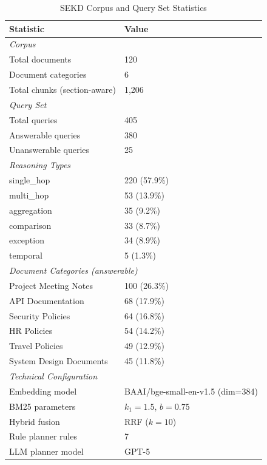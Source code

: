 
\usepackage{booktabs}
\usepackage{multirow}
\usepackage{siunitx}
\usepackage{xcolor}
\usepackage{caption}


\begin{table}[ht]
\centering
\caption{SEKD Corpus and Query Set Statistics}
\label{tab:dataset}
\begin{tabular}{ll}
\toprule
\textbf{Statistic} & \textbf{Value} \\
\midrule
\multicolumn{2}{l}{\textit{Corpus}} \\
\quad Total documents & 120 \\
\quad Document categories & 6 \\
\quad Total chunks (section-aware) & 1{,}206 \\
\midrule
\multicolumn{2}{l}{\textit{Query Set}} \\
\quad Total queries & 405 \\
\quad Answerable queries & 380 \\
\quad Unanswerable queries & 25 \\
\midrule
\multicolumn{2}{l}{\textit{Reasoning Types}} \\
\quad single\_hop & 220 (57.9\%) \\
\quad multi\_hop & 53 (13.9\%) \\
\quad aggregation & 35 (9.2\%) \\
\quad comparison & 33 (8.7\%) \\
\quad exception & 34 (8.9\%) \\
\quad temporal & 5 (1.3\%) \\
\midrule
\multicolumn{2}{l}{\textit{Document Categories (answerable)}} \\
\quad Project Meeting Notes & 100 (26.3\%) \\
\quad API Documentation & 68 (17.9\%) \\
\quad Security Policies & 64 (16.8\%) \\
\quad HR Policies & 54 (14.2\%) \\
\quad Travel Policies & 49 (12.9\%) \\
\quad System Design Documents & 45 (11.8\%) \\
\midrule
\multicolumn{2}{l}{\textit{Technical Configuration}} \\
\quad Embedding model & BAAI/bge-small-en-v1.5 (dim=384) \\
\quad BM25 parameters & $k_1{=}1.5$, $b{=}0.75$ \\
\quad Hybrid fusion & RRF ($k{=}10$) \\
\quad Rule planner rules & 7 \\
\quad LLM planner model & GPT-5 \\
\bottomrule
\end{tabular}
\end{table}



